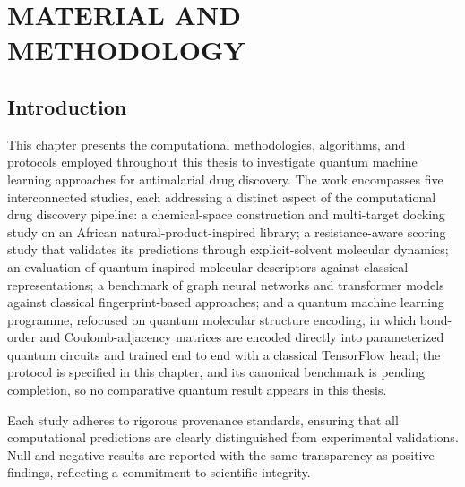 \chapter{MATERIAL AND METHODOLOGY}
\label{Chap:2}
\adjustmtc[0]
\begin{tcolorbox}[beamer]
	\minitoc
\end{tcolorbox}
\newpage

\section{Introduction}\label{sec:ch2_intro}

This chapter presents the computational methodologies, algorithms, and protocols employed throughout this thesis to investigate quantum machine learning approaches for antimalarial drug discovery. The work encompasses five interconnected studies, each addressing a distinct aspect of the computational drug discovery pipeline: a chemical-space construction and multi-target docking study on an African natural-product-inspired library; a resistance-aware scoring study that validates its predictions through explicit-solvent molecular dynamics; an evaluation of quantum-inspired molecular descriptors against classical representations; a benchmark of graph neural networks and transformer models against classical fingerprint-based approaches; and a quantum machine learning programme, refocused on quantum molecular structure encoding, in which bond-order and Coulomb-adjacency matrices are encoded directly into parameterized quantum circuits and trained end to end with a classical TensorFlow head; the protocol is specified in this chapter, and its canonical benchmark is pending completion, so no comparative quantum result appears in this thesis.

Each study adheres to rigorous provenance standards, ensuring that all computational predictions are clearly distinguished from experimental validations. Null and negative results are reported with the same transparency as positive findings, reflecting a commitment to scientific integrity.

